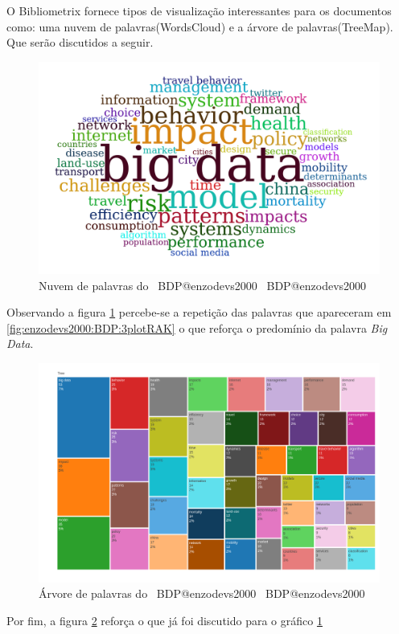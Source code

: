 O Bibliometrix fornece tipos de visualização interessantes para os documentos como: uma nuvem de palavras(WordsCloud) e a árvore de palavras(TreeMap). Que serão discutidos a seguir.

\begin{figure}[H]
    \centering
    \includegraphics[width=1\textwidth]{experiments/enzodevs2000/AnaliseBibliometrica/BigDataInPolicy/Figures/Graficos/NovoDataset/Documents/wordsCloud.png}
    \caption{Nuvem de palavras do \dataset\ BDP@enzodevs2000
    \dataset\ BDP@enzodevs2000}
    \label{fig:enzodevs2000:BDP:newdataset:documents:words_cloud}
\end{figure}

Observando a figura \ref{fig:enzodevs2000:BDP:newdataset:documents:words_cloud} percebe-se a repetição das palavras que apareceram em \ref{fig:enzodevs2000:BDP:3plotRAK} o que reforça o predomínio da palavra \textit{Big Data}.

\begin{figure}[H]
    \centering
    \includegraphics[width=1\textwidth]{experiments/enzodevs2000/AnaliseBibliometrica/BigDataInPolicy/Figures/Graficos/NovoDataset/Documents/TreeMap.png}
    \caption{Árvore de palavras do \dataset\ BDP@enzodevs2000
    \dataset\ BDP@enzodevs2000}
    \label{fig:enzodevs2000:BDP:newdataset:documents:tree_map}
\end{figure}
 Por fim, a figura \ref{fig:enzodevs2000:BDP:newdataset:documents:tree_map} reforça o que já foi discutido para o gráfico \ref{fig:enzodevs2000:BDP:newdataset:documents:words_cloud}